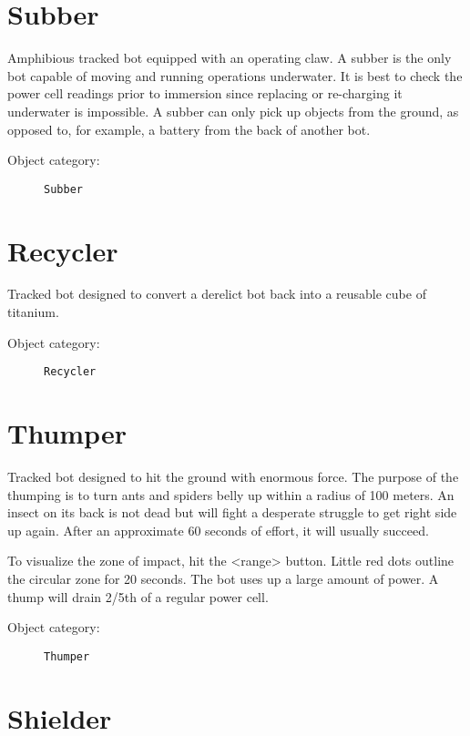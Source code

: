 \section{Subber}

Amphibious tracked bot equipped with an operating claw. A subber is the only bot capable of moving and running operations underwater. It is best to check the power cell readings prior to immersion since replacing or re-charging it underwater is impossible. A subber can only pick up objects from the ground, as opposed to, for example, a battery from the back of another bot.

\begin{description}
    \item[Object category:] \texttt{Subber}
\end{description}


\section{Recycler}

Tracked bot designed to convert a derelict bot back into a reusable cube of titanium.

\begin{description}
    \item[Object category:] \texttt{Recycler}
\end{description}


\section{Thumper}

Tracked bot designed to hit the ground with enormous force. The purpose of the thumping is to turn ants and spiders belly up within a radius of 100 meters. An insect on its back is not dead but will fight a desperate struggle to get right side up again. After an approximate 60 seconds of effort, it will usually succeed.

To visualize the zone of impact, hit the <range> button. Little red dots outline the circular zone for 20 seconds. The bot uses up a large amount of power. A thump will drain 2/5th of a regular power cell.

\begin{description}
    \item[Object category:] \texttt{Thumper}
\end{description}


\section{Shielder}

